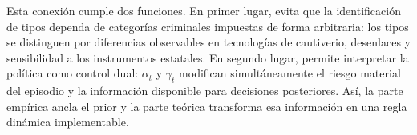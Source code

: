 \documentclass[12pt]{article}
\theoremstyle{definition}
\theoremstyle{remark}
\newcommand{\1}{\mathbf{1}}
\begin{document}
Esta conexión cumple dos funciones. En primer lugar, evita que la identificación de tipos dependa de categorías criminales impuestas de forma arbitraria: los tipos se distinguen por diferencias observables en tecnologías de cautiverio, desenlaces y sensibilidad a los instrumentos estatales. En segundo lugar, permite interpretar la política como control dual: $\alpha_t$ y $\gamma_t$ modifican simultáneamente el riesgo material del episodio y la información disponible para decisiones posteriores. Así, la parte empírica ancla el prior y la parte teórica transforma esa información en una regla dinámica implementable.



\clearpage

\end{document}
